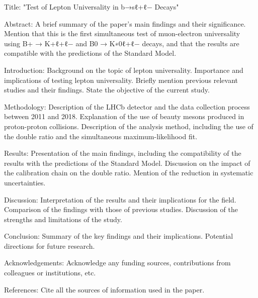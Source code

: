 Title: "Test of Lepton Universality in b→sℓ+ℓ− Decays"

Abstract: A brief summary of the paper's main findings and their significance. Mention that this is the first simultaneous test of muon-electron universality using B+ → K+ℓ+ℓ− and B0 → K∗0ℓ+ℓ− decays, and that the results are compatible with the predictions of the Standard Model.

Introduction:
    Background on the topic of lepton universality.
    Importance and implications of testing lepton universality.
    Briefly mention previous relevant studies and their findings.
    State the objective of the current study.

Methodology:
    Description of the LHCb detector and the data collection process between 2011 and 2018.
    Explanation of the use of beauty mesons produced in proton-proton collisions.
    Description of the analysis method, including the use of the double ratio and the simultaneous maximum-likelihood fit.

Results:
    Presentation of the main findings, including the compatibility of the results with the predictions of the Standard Model.
    Discussion on the impact of the calibration chain on the double ratio.
    Mention of the reduction in systematic uncertainties.

Discussion:
    Interpretation of the results and their implications for the field.
    Comparison of the findings with those of previous studies.
    Discussion of the strengths and limitations of the study.

Conclusion:
    Summary of the key findings and their implications.
    Potential directions for future research.

Acknowledgements: Acknowledge any funding sources, contributions from colleagues or institutions, etc.

References: Cite all the sources of information used in the paper.
